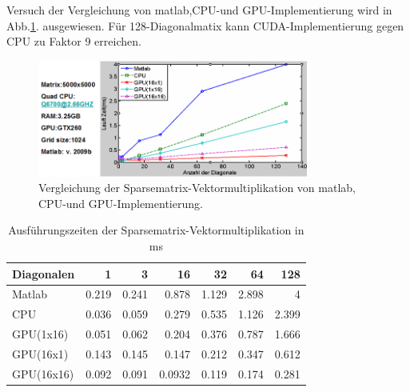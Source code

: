 

Versuch der Vergleichung von matlab,CPU-und GPU-Implementierung wird in Abb.\ref{sparse_ergebnis}. ausgewiesen. Für 128-Diagonalmatix kann CUDA-Implementierung gegen CPU zu Faktor 9 erreichen.


\begin{figure}[htbp]
\includegraphics[width=3.5in]{../xby/pic//sparse_ergebnis}
\caption{Vergleichung der Sparsematrix-Vektormultiplikation von matlab, CPU-und GPU-Implementierung.}
\label{sparse_ergebnis}
\end{figure}


\begin{table}
\renewcommand{\arraystretch}{1.3}
\caption{Ausführungszeiten der Sparsematrix-Vektormultiplikation in ms}
\label{sparse_result}
\centering
\begin{tabular}{|l|r|r|r|r|r|r|}

\hline
Diagonalen& 1& 3& 16& 32& 64 &128\\


\hline
\hline
Matlab     &   0.219   &   0.241&   0.878  &  1.129 &  2.898  & 4\\
CPU        & 	0.036 &   0.059& 	0.279  &  0.535 &  1.126  & 2.399 \\
GPU(1x16)  & 0.051     &   0.062 &  0.204  &  0.376 &  0.787  & 1.666\\
GPU(16x1)  & 0.143     &	0.145 &	0.147  &  0.212 &	0.347 &	0.612\\

GPU(16x16)     & 0.092 &	0.091  &	0.0932 &	0.119&	0.174 &	0.281\\

\hline
\end{tabular}
\end{table}